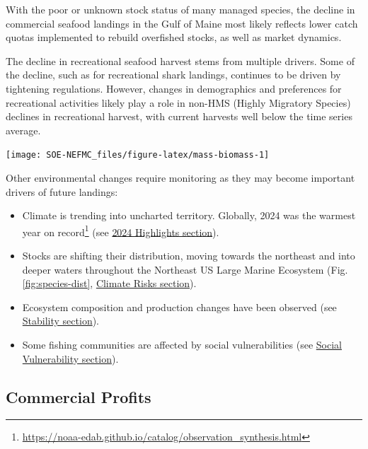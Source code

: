 \documentclass[
  10pt,
]{article}
\providecommand{\tightlist}{%
  \setlength{\itemsep}{0pt}\setlength{\parskip}{0pt}}
\let\origfigure\figure
\let\endorigfigure\endfigure
\renewenvironment{figure}[1][2] {
    \expandafter\origfigure\expandafter[H]
} {
    \endorigfigure
}
\begin{document}
With the poor or unknown stock status of many managed species, the decline in commercial seafood landings in the Gulf of Maine most likely reflects lower catch quotas implemented to rebuild overfished stocks, as well as market dynamics.

The decline in recreational seafood harvest stems from multiple drivers. Some of the decline, such as for recreational shark landings, continues to be driven by tightening regulations. However, changes in demographics and preferences for recreational activities likely play a role in non-HMS (Highly Migratory Species) declines in recreational harvest, with current harvests well below the time series average.

\begin{figure}

{\centering \texttt{[image: SOE-NEFMC\_files/figure-latex/mass-biomass-1]} 

}

\caption{Spring (left) and fall (right) surveyed biomass from the state of Massachusetts inshore survey. The shaded area around each annual mean represents 2 standard deviations from the mean.}\label{fig:mass-biomass}
\end{figure}

Other environmental changes require monitoring as they may become important drivers of future landings:

\begin{itemize}
\tightlist
\item
  Climate is trending into uncharted territory. Globally, 2024 was the warmest year on record\footnote{\url{https://noaa-edab.github.io/catalog/observation_synthesis.html}} (see \protect\hyperlink{highlights}{2024 Highlights section}).
\item
  Stocks are shifting their distribution, moving towards the northeast and into deeper waters throughout the Northeast US Large Marine Ecosystem (Fig. \ref{fig:species-dist}, \protect\hyperlink{climate-risks}{Climate Risks section}).
\item
  Ecosystem composition and production changes have been observed (see \protect\hyperlink{stability}{Stability section}).
\item
  Some fishing communities are affected by social vulnerabilities (see \protect\hyperlink{social-vulnerability}{Social Vulnerability section}).
\end{itemize}

\newpage

\hypertarget{commercial-profits}{%
\subsection{Commercial Profits}\label{commercial-profits}}
\end{document}
